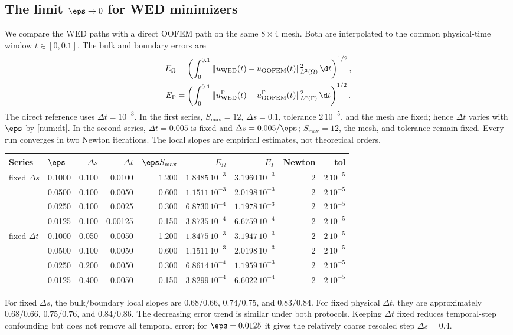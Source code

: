 \subsection{The limit $\eps\to0$ for WED minimizers}
We compare the WED paths with a direct OOFEM path on the same $8\times4$ mesh. Both are interpolated to the common physical-time window $t\in[0,0.1]$. The bulk and boundary errors are
\begin{equation}
\label{num:errors}
\begin{split}
E_\Omega&=\left(\int_0^{0.1}\|u_{\rm WED}(t)-u_{\rm OOFEM}(t)\|^2_{L^2(\Omega)}\,\d t\right)^{1/2},\\
E_\Gamma&=\left(\int_0^{0.1}\|u^\Gamma_{\rm WED}(t)-u^\Gamma_{\rm OOFEM}(t)\|^2_{L^2(\Gamma)}\,\d t\right)^{1/2}.
\end{split}
\end{equation}
The direct reference uses $\Delta t=10^{-3}$. In the first series, $S_{\max}=12$, $\Delta s=0.1$, tolerance $2\,10^{-5}$, and the mesh are fixed; hence $\Delta t$ varies with $\eps$ by \eqref{num:dt}. In the second series, $\Delta t=0.005$ is fixed and $\Delta s=0.005/\eps$; $S_{\max}=12$, the mesh, and tolerance remain fixed. Every run converges in two Newton iterations. The local slopes are empirical estimates, not theoretical orders.
\begin{center}\scriptsize
\begin{tabular}{llrrrrrrr}
\hline
Series&$\eps$&$\Delta s$&$\Delta t$&$\eps S_{\max}$&$E_\Omega$&$E_\Gamma$&Newton&tol\\
\hline
fixed $\Delta s$&0.1000&0.100&0.0100&1.200&$1.8485\,10^{-3}$&$3.1960\,10^{-3}$&2&$2\,10^{-5}$\\
&0.0500&0.100&0.0050&0.600&$1.1511\,10^{-3}$&$2.0198\,10^{-3}$&2&$2\,10^{-5}$\\
&0.0250&0.100&0.0025&0.300&$6.8730\,10^{-4}$&$1.1978\,10^{-3}$&2&$2\,10^{-5}$\\
&0.0125&0.100&0.00125&0.150&$3.8735\,10^{-4}$&$6.6759\,10^{-4}$&2&$2\,10^{-5}$\\
fixed $\Delta t$&0.1000&0.050&0.0050&1.200&$1.8475\,10^{-3}$&$3.1947\,10^{-3}$&2&$2\,10^{-5}$\\
&0.0500&0.100&0.0050&0.600&$1.1511\,10^{-3}$&$2.0198\,10^{-3}$&2&$2\,10^{-5}$\\
&0.0250&0.200&0.0050&0.300&$6.8614\,10^{-4}$&$1.1959\,10^{-3}$&2&$2\,10^{-5}$\\
&0.0125&0.400&0.0050&0.150&$3.8299\,10^{-4}$&$6.6022\,10^{-4}$&2&$2\,10^{-5}$\\
\hline
\end{tabular}
\end{center}
For fixed $\Delta s$, the bulk/boundary local slopes are $0.68/0.66$, $0.74/0.75$, and $0.83/0.84$. For fixed physical $\Delta t$, they are approximately $0.68/0.66$, $0.75/0.76$, and $0.84/0.86$. The decreasing error trend is similar under both protocols. Keeping $\Delta t$ fixed reduces temporal-step confounding but does not remove all temporal error; for $\eps=0.0125$ it gives the relatively coarse rescaled step $\Delta s=0.4$.

